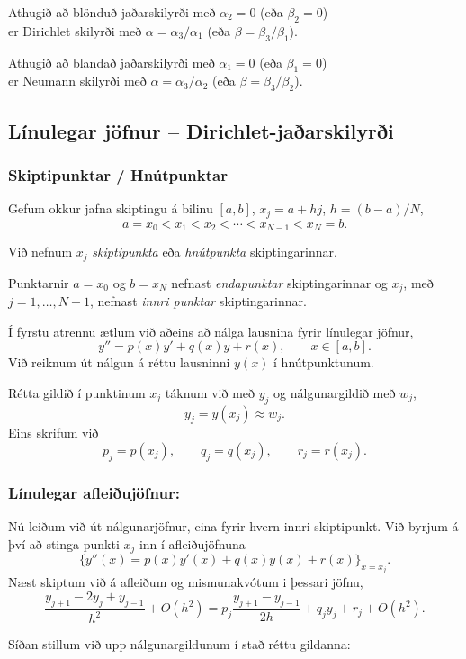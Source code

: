 \documentclass[icelandic,a4paper,12pt]{article}
\begin{document}
\bigskip
Athugið að blönduð jaðarskilyrði með $\alpha_2=0$ (eða $\beta_2=0$)\\
er Dirichlet skilyrði með 
$\alpha=\alpha_3/\alpha_1$ (eða $\beta=\beta_3/\beta_1$).
\pause

\smallskip
Athugið að blandað jaðarskilyrði með $\alpha_1=0$ (eða $\beta_1=0$)\\
er  Neumann skilyrði með 
$\alpha=\alpha_3/\alpha_2$ (eða $\beta=\beta_3/\beta_2$).



\subsection{Línulegar jöfnur -- Dirichlet-jaðarskilyrði}
\subsubsection{Skiptipunktar / Hnútpunktar} 
Gefum okkur jafna skiptingu á bilinu $[a,b]$, $x_j=a+hj$, 
$h=(b-a)/N$,
$$
a=x_0<x_1<x_2<\cdots<x_{N-1}<x_N=b.
$$

\pause
Við nefnum $x_j$  {\it skiptipunkta} eða {\it hnútpunkta} skiptingarinnar.  

\pause
\smallskip
Punktarnir $a=x_0$ og $b=x_N$ nefnast {\it endapunktar}
skiptingarinnar og $x_j$, með $j=1,\dots,N-1$, 
nefnast {\it innri punktar} skiptingarinnar.

\pause
\smallskip
Í fyrstu atrennu ætlum við aðeins að nálga lausnina fyrir
línulegar jöfnur,
$$
y''=p(x)y'+q(x)y+r(x), \qquad x\in [a,b].
$$
Við reiknum út nálgun á réttu lausninni $y(x)$ í
hnútpunktunum. 

\pause
\smallskip
Rétta gildið í punktinum $x_j$ táknum við með $y_j$ og nálgunargildið
með $w_j$, 
$$
y_j=y(x_j)\approx w_j.
$$\pause 
Eins skrifum við 
$$
p_j=p(x_j), \qquad q_j=q(x_j), \qquad  r_j=r(x_j).
$$


\subsubsection{Línulegar afleiðujöfnur:} 
Nú leiðum við út nálgunarjöfnur, eina fyrir hvern innri skiptipunkt.
Við byrjum á því að stinga punkti $x_j$ inn í afleiðujöfnuna
$$
\big\{ y''(x)= p(x)y'(x)+q(x)y(x) + r(x)\big\}_{x=x_j}.
$$
Næst skiptum við á afleiðum og mismunakvótum i þessari jöfnu,
$$
\dfrac{y_{j+1}-2y_j+y_{j-1}}{h^2} +O(h^2)
=p_j\dfrac{y_{j+1}-y_{j-1}}{2h}+q_jy_j+r_j+ O(h^2).
$$

\pause
Síðan  stillum við upp nálgunargildunum  í stað réttu gildanna:
\end{document}

